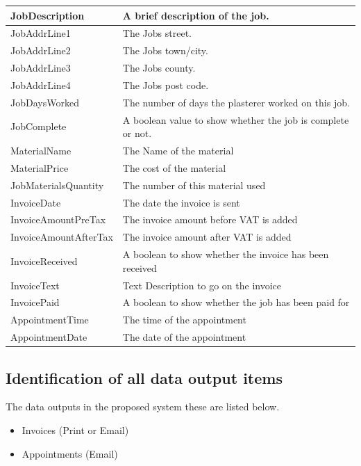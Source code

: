 \begin{flushleft}
\begin{longtable}{|p{3.5cm}|p{5cm}|}
JobDescription & A brief description of the job. \\ \hline
JobAddrLine1 & The Jobs street. \\ \hline
JobAddrLine2 & The Jobs town/city. \\ \hline
JobAddrLine3 & The Jobs county. \\ \hline
JobAddrLine4 & The Jobs post code. \\ \hline
JobDaysWorked & The number of days the plasterer worked on this job. \\ \hline
JobComplete & A boolean value to show whether the job is complete or not. \\ \hline \hline

MaterialName & The Name of the material \\ \hline
MaterialPrice & The cost of the material \\ \hline
JobMaterialsQuantity & The number of this material used \\ \hline \hline

InvoiceDate & The date the invoice is sent \\ \hline
InvoiceAmountPreTax & The invoice amount before VAT is added \\ \hline
InvoiceAmountAfterTax & The invoice amount after VAT is added \\ \hline
InvoiceReceived & A boolean to show whether the invoice has been received \\ \hline
InvoiceText & Text Description to go on the invoice \\ \hline 
InvoicePaid & A boolean to show whether the job has been paid for \\ \hline \hline

AppointmentTime & The time of the appointment \\ \hline
AppointmentDate & The date of the appointment \\ \hline 

\end{longtable}

\end{flushleft}


\subsection{Identification of all data output items}
\begin{flushleft}
The data outputs in the proposed system these are listed below.
\end{flushleft}
\begin{itemize}
\item Invoices (Print or Email)
\item Appointments (Email)
\end{itemize}

